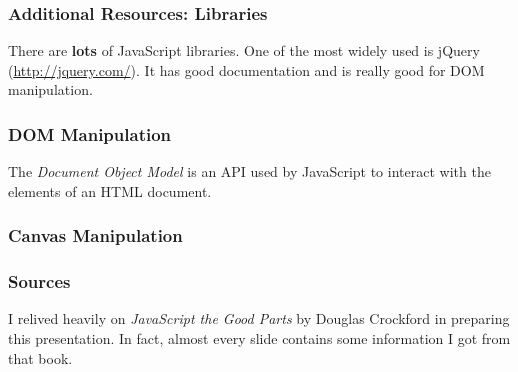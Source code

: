 \documentclass{lug}
\begin{document}
\begin{frame}
    \frametitle{Additional Resources: Libraries}

    There are \textbf{lots} of JavaScript libraries. One of the most widely used is jQuery
    (\url{http://jquery.com/}). It has good documentation and is really good for DOM
    manipulation.\\

\end{frame}

\begin{frame}
    \frametitle{DOM Manipulation}
    The \textit{Document Object Model} is an API used by JavaScript to interact with the elements of
    an HTML document.\footnotemark[1]


\end{frame}

\begin{frame}
    \frametitle{Canvas Manipulation}

\end{frame}

\begin{frame}
    \frametitle{Sources}

    I relived heavily on \textit{JavaScript the Good Parts} by Douglas Crockford in preparing this
    presentation. In fact, almost every slide contains some information I got from that book.
\end{frame}
\end{document}

